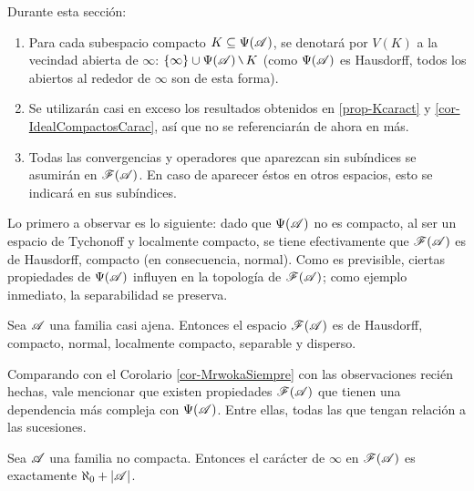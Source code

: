 	\begin{consideracion}
		Durante esta sección:
		\begin{enumerate}
			\item Para cada subespacio compacto $K \subseteq \Psi(\mathscr{A})$, se denotará por $V(K)$ a la vecindad abierta de $\infty$: $\{\infty\} \cup \Psi(\ms{A}) \setminus K$ (como $\Psi(\mathscr{A})$ es Hausdorff, todos los abiertos al rededor de $\infty$ son de esta forma).
			\item Se utilizarán casi en exceso los resultados obtenidos en \ref{prop-Kcaract} y \ref{cor-IdealCompactosCarac}, así que no se referenciarán de ahora en más.
			\item Todas las convergencias y operadores que aparezcan sin subíndices se asumirán en $\mathscr{F}(\mathscr{A})$. En caso de aparecer éstos en otros espacios, esto se indicará en sus subíndices.
		\end{enumerate}
	\end{consideracion}

	Lo primero a observar es lo siguiente: dado que $\Psi(\mathscr{A})$ no es compacto, al ser un espacio de Tychonoff y localmente compacto, se tiene efectivamente que $\mathscr{F}(\mathscr{A})$ es de Hausdorff, compacto (en consecuencia, normal). Como es previsible, ciertas propiedades de $\Psi(\mathscr{A})$ influyen en la topología de $\mathscr{F}(\mathscr{A})$; como ejemplo inmediato, la separabilidad se preserva.

	\begin{observacion}
		Sea $\mathscr{A}$ una familia casi ajena. Entonces el espacio $\mathscr{F}(\mathscr{A})$ es de Hausdorff, compacto, normal, localmente compacto, separable y disperso.
	\end{observacion}

	Comparando con el Corolario \ref{cor-MrwokaSiempre} con las observaciones recién hechas, vale mencionar que existen propiedades $\mathscr{F}(\mathscr{A})$ que tienen una dependencia más compleja con $\Psi(\mathscr{A})$. Entre ellas, todas las que tengan relación a las sucesiones.

	\begin{proposicion}\label{prop-caracterFrechet}
		Sea $\mathscr{A}$ una familia no compacta. Entonces el carácter de $\infty$ en $\mathscr{F}(\mathscr{A})$ es exactamente $\aleph_0 + |\mathscr{A}|$.
	\end{proposicion}
	
